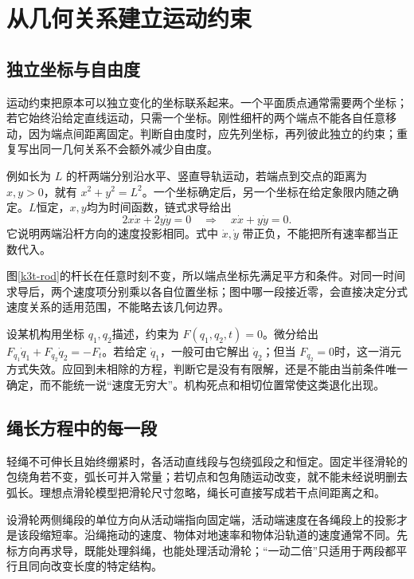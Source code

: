 \section{从几何关系建立运动约束}
\subsection{独立坐标与自由度}
运动约束把原本可以独立变化的坐标联系起来。一个平面质点通常需要两个坐标；若它始终沿给定直线运动，只需一个坐标。刚性细杆的两个端点不能各自任意移动，因为端点间距离固定。判断自由度时，应先列坐标，再列彼此独立的约束；重复写出同一几何关系不会额外减少自由度。

例如长为 $L$ 的杆两端分别沿水平、竖直导轨运动，若端点到交点的距离为 $x,y>0$，就有 $x^2+y^2=L^2$。一个坐标确定后，另一个坐标在给定象限内随之确定。$L$恒定，$x,y$均为时间函数，链式求导给出
\[
 2x\dot x+2y\dot y=0
 \quad\Longrightarrow\quad x\dot x+y\dot y=0.
\]
它说明两端沿杆方向的速度投影相同。式中 $\dot x,\dot y$ 带正负，不能把所有速率都当正数代入。

图\ref{k3t-rod}的杆长在任意时刻不变，所以端点坐标先满足平方和条件。对同一时间求导后，两个速度项分别乘以各自位置坐标；图中哪一段接近零，会直接决定分式速度关系的适用范围，不能略去该几何边界。


设某机构用坐标 $q_1,q_2$描述，约束为 $F(q_1,q_2,t)=0$。微分给出 $F_{q_1}\dot q_1+F_{q_2}\dot q_2=-F_t$。若给定 $\dot q_1$，一般可由它解出 $\dot q_2$；但当 $F_{q_2}=0$时，这一消元方式失效。应回到未相除的方程，判断它是没有有限解，还是不能由当前条件唯一确定，而不能统一说“速度无穷大”。机构死点和相切位置常使这类退化出现。


\subsection{绳长方程中的每一段}
轻绳不可伸长且始终绷紧时，各活动直线段与包绕弧段之和恒定。固定半径滑轮的包绕角若不变，弧长可并入常量；若切点和包角随运动改变，就不能未经说明删去弧长。理想点滑轮模型把滑轮尺寸忽略，绳长可直接写成若干点间距离之和。

设滑轮两侧绳段的单位方向从活动端指向固定端，活动端速度在各绳段上的投影才是该段缩短率。沿绳拖动的速度、物体对地速率和物体沿轨道的速度通常不同。先标方向再求导，既能处理斜绳，也能处理活动滑轮；“一动二倍”只适用于两段都平行且同向改变长度的特定结构。

